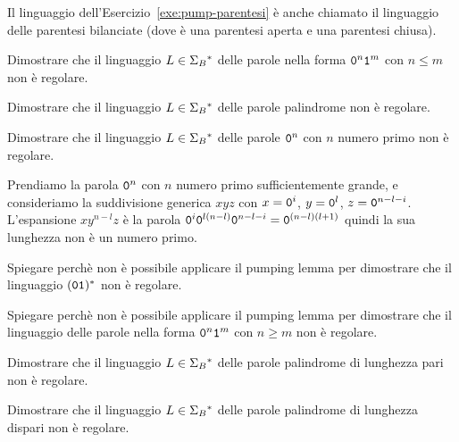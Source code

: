 Il linguaggio dell'Esercizio~\ref{exe:pump-parentesi} è anche chiamato il linguaggio delle parentesi bilanciate (dove
\zero è una parentesi aperta e \uno una parentesi chiusa).


\begin{Exercise}\label{exe:pump-tanti-1}
	Dimostrare che il linguaggio $L\in\Sigma_{B}{}^{\ast}$ delle parole nella forma $\mathtt{0}^n\mathtt{1}^m$ con $n\leq m$
	non è regolare.
\end{Exercise}

\begin{Exercise}\label{exe:pump-palindrome}
	Dimostrare che il linguaggio $L\in\Sigma_{B}{}^{\ast}$ delle parole palindrome
	non è regolare.
\end{Exercise}



\begin{Exercise}\label{exe:pump-primi}
	Dimostrare che il linguaggio $L\in\Sigma_{B}{}^{\ast}$ delle parole $\mathtt{0}^{n}$ con $n$ numero primo
	non è regolare.
\end{Exercise}

\begin{Answer}
	Prendiamo la parola $\mathtt{0}^{n}$ con $n$ numero primo sufficientemente grande, e consideriamo la suddivisione generica
	$xyz$ con $x=\mathtt{0}^{i}$, $y=\mathtt{0}^{l}$, $z=\mathtt{0}^{n-l-i}$.
	L'espansione $xy^{n-l}z$ è la parola $\mathtt{0}^{i}\mathtt{0}^{l(n-l)}\mathtt{0}^{n-l-i} = \mathtt{0}^{(n-l)(l+1)}$ quindi la sua lunghezza
	non è un numero primo.
\end{Answer}


\begin{Exercise}\label{exe:pump-regolare}
	Spiegare perchè non è possibile applicare il pumping lemma per dimostrare che il linguaggio  $(\mathtt{0}\mathtt{1}){}^{\ast}$ non è
	regolare.
\end{Exercise}

\begin{Exercise}\label{exe:pump-tanti-0}
	Spiegare perchè non è possibile applicare il pumping lemma per dimostrare che il linguaggio delle parole nella forma
	$\mathtt{0}^n\mathtt{1}^m$ con $n\geq m$ non è regolare.
\end{Exercise}


\begin{Exercise}\label{exe:pump-palindromi-pari}
	Dimostrare che il linguaggio $L\in\Sigma_{B}{}^{\ast}$ delle parole palindrome di lunghezza pari
	non è regolare.
\end{Exercise}

\begin{Exercise}\label{exe:pump-palindromi-dispari}
	Dimostrare che il linguaggio $L\in\Sigma_{B}{}^{\ast}$ delle parole palindrome di lunghezza dispari
	non è regolare.
\end{Exercise}

